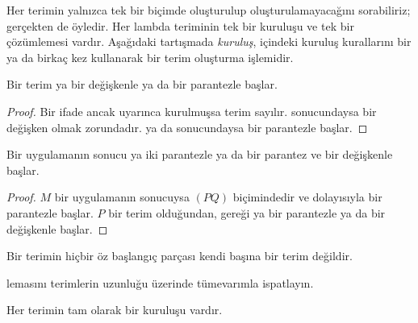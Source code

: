 \documentclass[../../../include/open-logic-section]{subfiles}
\begin{document}

Her terimin yalnızca tek bir biçimde oluşturulup oluşturulamayacağını
sorabiliriz; gerçekten de öyledir. Her lambda teriminin tek bir kuruluşu ve
tek bir çözümlemesi vardır. Aşağıdaki tartışmada \emph{kuruluş},
 içindeki kuruluş kurallarını bir ya da birkaç kez
kullanarak bir terim oluşturma işlemidir.

\begin{lem}
Bir terim ya bir değişkenle ya da bir parantezle başlar.
\end{lem}

\begin{proof}
Bir ifade ancak  uyarınca kurulmuşsa terim sayılır.
 sonucundaysa bir değişken olmak zorundadır.
 ya da  sonucundaysa bir
parantezle başlar.
\end{proof}

\begin{lem}
Bir uygulamanın sonucu ya iki parantezle ya da bir parantez ve bir değişkenle
başlar.
\end{lem}

\begin{proof}
$M$ bir uygulamanın sonucuysa $(PQ)$ biçimindedir ve dolayısıyla bir
parantezle başlar. $P$ bir terim olduğundan,  gereği ya
bir parantezle ya da bir değişkenle başlar.
\end{proof}

\begin{lem}
Bir terimin hiçbir öz başlangıç parçası kendi başına bir terim değildir.
\end{lem}

\begin{prob}
 lemasını terimlerin uzunluğu üzerinde
tümevarımla ispatlayın.
\end{prob}

\begin{prop} 
Her terimin tam olarak bir kuruluşu vardır.
\end{prop}
\end{document}
